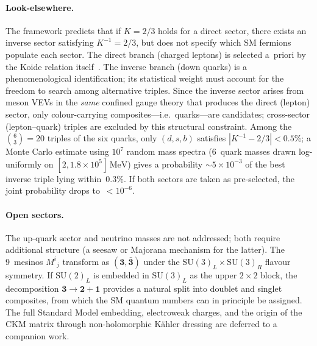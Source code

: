 \documentclass[preprint,12pt]{elsarticle}
\newcommand{\SU}{\mathrm{SU}}
\newcommand{\MeV}{\,\mathrm{MeV}}
\begin{document}
\paragraph{Look-elsewhere.}
The framework predicts that if $K = 2/3$ holds
for a direct sector, there exists an inverse sector
satisfying $K^{-1} = 2/3$, but does not specify
which SM fermions populate each sector.
The direct branch (charged leptons) is selected
a~priori by the Koide relation
itself~\cite{Koide:1983qe}.
The inverse branch (down quarks) is a phenomenological
identification; its statistical weight must
account for the freedom to search among
alternative triples.
Since the inverse sector arises from meson VEVs
in the \emph{same} confined gauge theory
that produces the direct (lepton) sector,
only colour-carrying composites---i.e.\ quarks---are
candidates; cross-sector (lepton--quark) triples are
excluded by this structural constraint.
Among the $\binom{6}{3} = 20$ triples of the
six quarks, only $(d,s,b)$ satisfies
$|K^{-1} - 2/3| < 0.5\%$;
a Monte Carlo estimate using $10^7$ random mass
spectra (6~quark masses drawn log-uniformly on
$[2, 1.8 \times 10^5]\MeV$) gives a probability
$\sim 5 \times 10^{-3}$ of the best inverse
triple lying within~$0.3\%$.
If both sectors are taken as pre-selected,
the joint probability drops to~$< 10^{-6}$.

\paragraph{Open sectors.}
The up-quark sector and neutrino masses are not addressed;
both require additional structure
(a seesaw or Majorana mechanism for the latter).
The 9~mesinos $M^i{}_j$ transform as
$(\mathbf{3},\bar{\mathbf{3}})$ under the
$\SU(3)_L \times \SU(3)_R$ flavour symmetry.
If $\SU(2)_L$ is embedded in $\SU(3)_L$ as the
upper $2 \times 2$ block, the decomposition
$\mathbf{3} \to \mathbf{2} + \mathbf{1}$
provides a natural split into doublet and singlet
composites, from which the SM quantum numbers
can in principle be assigned.
The full Standard Model embedding, electroweak charges,
and the origin of the CKM matrix through non-holomorphic
K\"ahler dressing are deferred to a companion work.

\end{document}
